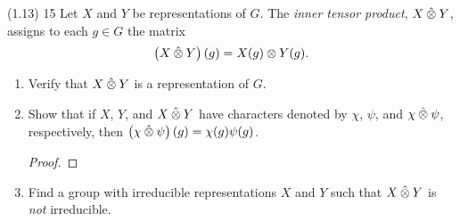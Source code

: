 \documentclass{../../math174}
\date{Wednesday March 6}
\author{}
\begin{document}
\begin{problemlist}
\item[(1.13) 15] Let \(X\) and \(Y\) be representations of \(G\).  The
  \emph{inner tensor product}, \(X \mathbin{\hat\otimes} Y\), assigns to each
  \(g \in G\) the matrix
  \[
    \left( {X \mathbin{\hat\otimes} Y} \right)(g) = X(g) \otimes Y(g).
  \]
  \begin{enumerate}
  \item Verify that \(X \mathbin{\hat\otimes} Y\) is a representation of \(G\).

    \begin{solution}

    \end{solution}

  \item Show that if \(X\), \(Y\), and \(X \mathbin{\hat\otimes} Y\) have
    characters denoted by \(\chi\), \(\psi\), and
    \(\chi \mathbin{\hat\otimes} \psi\), respectively, then
    \(\left( {\chi \mathbin{\hat\otimes} \psi} \right)(g) = \chi(g) \psi(g)\).

    \begin{solution}
      \begin{proof}

      \end{proof}
    \end{solution}

  \item Find a group with irreducible representations \(X\) and \(Y\)
    such that \(X \mathbin{\hat\otimes} Y\) is \emph{not} irreducible.

    \begin{solution}

    \end{solution}
  \end{enumerate}
\end{problemlist}
\end{document}
